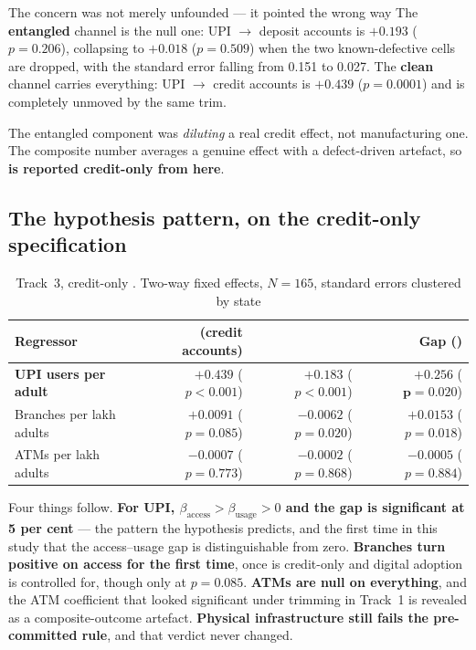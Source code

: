 \begin{keybox}{The concern was not merely unfounded --- it pointed the wrong way}
The \textbf{entangled} channel is the null one: UPI $\to$ deposit accounts is $+0.193$
($p = 0.206$), collapsing to $+0.018$ ($p = 0.509$) when the two known-defective cells are dropped,
with the standard error falling from 0.151 to 0.027. The \textbf{clean} channel carries everything:
UPI $\to$ credit accounts is $+0.439$ ($p = 0.0001$) and is completely unmoved by the same trim.

\medskip
The entangled component was \emph{diluting} a real credit effect, not manufacturing one. The
composite \Access{} number averages a genuine effect with a defect-driven artefact, so
\textbf{\Access{} is reported credit-only from here}.
\end{keybox}

\subsection{The hypothesis pattern, on the credit-only specification}

\begin{table}[H]
\centering
\caption{Track~3, credit-only \Access{}. Two-way fixed effects, $N = 165$, standard errors
clustered by state}
\label{tab:digital}
\small
\begin{tabular}{@{}lrrr@{}}
\toprule
Regressor & \Access{} (credit accounts) & \Usage{} & Gap (\AUG{}) \\
\midrule
\textbf{UPI users per adult} & $\mathbf{+0.439}$ ($p<0.001$) & $\mathbf{+0.183}$ ($p<0.001$)
  & $\mathbf{+0.256}$ ($\mathbf{p=0.020}$) \\
Branches per lakh adults & $+0.0091$ ($p=0.085$) & $-0.0062$ ($p=0.020$) & $+0.0153$ ($p=0.018$) \\
ATMs per lakh adults & $-0.0007$ ($p=0.773$) & $-0.0002$ ($p=0.868$) & $-0.0005$ ($p=0.884$) \\
\bottomrule
\end{tabular}
\end{table}

\noindent
Four things follow. \textbf{For UPI, $\beta_{\text{access}} > \beta_{\text{usage}} > 0$ and the gap
is significant at 5 per cent} --- the pattern the hypothesis predicts, and the first time in this
study that the access--usage gap is distinguishable from zero. \textbf{Branches turn positive on
access for the first time}, once \Access{} is credit-only and digital adoption is controlled for,
though only at $p = 0.085$. \textbf{ATMs are null on everything}, and the ATM coefficient that
looked significant under trimming in Track~1 is revealed as a composite-outcome artefact.
\textbf{Physical infrastructure still fails the pre-committed rule}, and that verdict never
changed.

